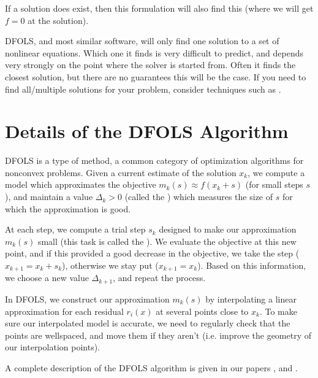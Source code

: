 \documentclass[letterpaper,10pt,english]{sphinxmanual}
\begin{document}
\sphinxAtStartPar
If a solution does exist, then this formulation will also find this (where we will get \(f=0\) at the solution).

\sphinxAtStartPar
{} DFO\sphinxhyphen{}LS, and most similar software, will only find one solution to a set of nonlinear equations. Which one it finds is very difficult to predict, and depends very strongly on the point where the solver is started from. Often it finds the closest solution, but there are no guarantees this will be the case. If you need to find all/multiple solutions for your problem, consider techniques such as .


\section{Details of the DFO\sphinxhyphen{}LS Algorithm}
\label{\detokenize{info:details-of-the-dfo-ls-algorithm}}
\sphinxAtStartPar
DFO\sphinxhyphen{}LS is a type of  method, a common category of optimization algorithms for nonconvex problems. Given a current estimate of the solution \(x_k\), we compute a model which approximates the objective \(m_k(s)\approx f(x_k+s)\) (for small steps \(s\)), and maintain a value \(\Delta_k>0\) (called the ) which measures the size of \(s\) for which the approximation is good.

\sphinxAtStartPar
At each step, we compute a trial step \(s_k\) designed to make our approximation \(m_k(s)\) small (this task is called the ). We evaluate the objective at this new point, and if this provided a good decrease in the objective, we take the step (\(x_{k+1}=x_k+s_k\)), otherwise we stay put (\(x_{k+1}=x_k\)). Based on this information, we choose a new value \(\Delta_{k+1}\), and repeat the process.

\sphinxAtStartPar
In DFO\sphinxhyphen{}LS, we construct our approximation \(m_k(s)\) by interpolating a linear approximation for each residual \(r_i(x)\) at several points close to \(x_k\). To make sure our interpolated model is accurate, we need to regularly check that the points are well\sphinxhyphen{}spaced, and move them if they aren’t (i.e. improve the geometry of our interpolation points).

\sphinxAtStartPar
A complete description of the DFO\sphinxhyphen{}LS algorithm is given in our papers ,  and .
\end{document}
